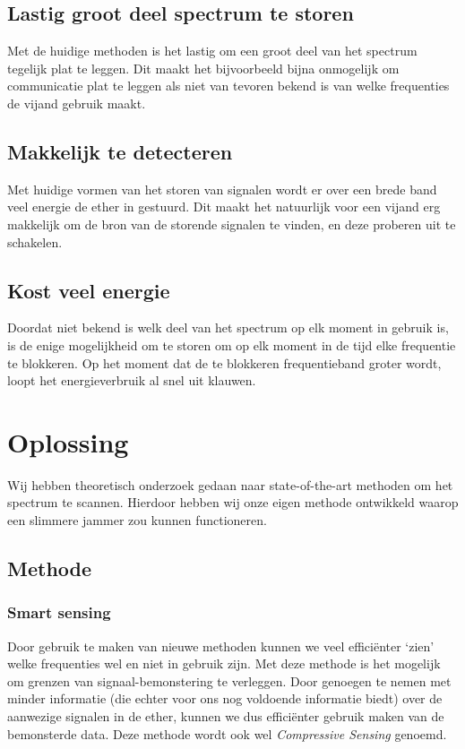 \documentclass[oneside, a4paper, openany]{memoir}
\begin{document}
\section{Lastig groot deel spectrum te storen}
Met de huidige methoden is het lastig om een groot deel van het spectrum tegelijk plat te leggen. Dit maakt het bijvoorbeeld bijna onmogelijk om communicatie plat te leggen als niet van tevoren bekend is van welke frequenties de vijand gebruik maakt.

\section{Makkelijk te detecteren}
Met huidige vormen van het storen van signalen wordt er over een brede band veel energie de ether in gestuurd. Dit maakt het natuurlijk voor een vijand erg makkelijk om de bron van de storende signalen te vinden, en deze proberen uit te schakelen.

\section{Kost veel energie}
Doordat niet bekend is welk deel van het spectrum op elk moment in gebruik is, is de enige mogelijkheid om te storen om op elk moment in de tijd elke frequentie te blokkeren. Op het moment dat de te blokkeren frequentieband groter wordt, loopt het energieverbruik al snel uit klauwen.

\chapter{Oplossing}
Wij hebben theoretisch onderzoek gedaan naar state-of-the-art methoden om het spectrum te scannen. Hierdoor hebben wij onze eigen methode ontwikkeld waarop een slimmere jammer zou kunnen functioneren.


\section{Methode}
\subsection{Smart sensing}
Door gebruik te maken van nieuwe methoden kunnen we veel efficiënter `zien' welke frequenties wel en niet in gebruik zijn. Met deze methode is het mogelijk om grenzen van signaal-bemonstering te verleggen. Door genoegen te nemen met minder informatie (die echter voor ons nog voldoende informatie biedt) over de aanwezige signalen in de ether, kunnen we dus efficiënter gebruik maken van de bemonsterde data. Deze methode wordt ook wel \textit{Compressive Sensing} genoemd.
\end{document}
